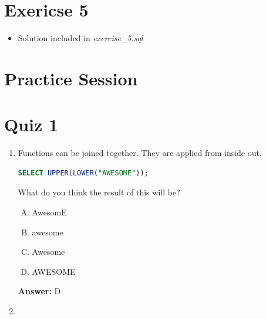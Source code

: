 \documentclass[12pt]{article}
\begin{document}
\bigskip

\section{Exericse 5}

\bigskip

\begin{itemize}
    \item Solution included in \textit{exercise\_5.sql}
\end{itemize}

\bigskip

\section{Practice Session}


\bigskip

\section{Quiz 1}

\bigskip

\begin{enumerate}[1.]
    \item

    Functions can be joined together. They are applied from inside out.

    \begin{lstlisting}[language=SQL]
    SELECT UPPER(LOWER("AWESOME"));
    \end{lstlisting}

    What do you think the result of this will be?

    \bigskip

    \begin{enumerate}[A.]
        \item AwesomE
        \item awesome
        \item Awesome
        \item AWESOME

    \end{enumerate}

    \textbf{Answer:} D

    \item



\end{enumerate}
\end{document}
